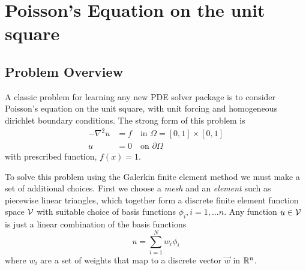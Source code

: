 %
%
%
%
%

\chapter{Poisson's Equation on the unit square}
\label{cha:poiss-equat-unit}

\section{Problem Overview}
\label{sec:problem-formulation}

A classic problem for learning any new PDE solver package is to
consider  Poisson's equation on the unit square,  with unit
forcing and homogeneous dirichlet boundary conditions.  The strong
form of this problem is
\begin{align}
-\nabla^2u &= f \quad\text{in } \Omega=[0,1]\times[0,1]\\
u &= 0 \quad\text{on } \partial\Omega
\end{align}
with  prescribed function, $f(x)=1$. 

To solve this problem using the Galerkin finite element method we must make a set of
additional choices. First we choose a \emph{mesh} and an \emph{element} such as
piecewise linear triangles, which together form a discrete finite
element function space $\mathcal{V}$ with suitable choice of basis
functions $\phi_{i}, i=1,\ldots n$. Any function $u\in\mathcal{V}$ is just a
linear combination of the basis functions
\begin{equation}
  \label{eq:6}
  u = \sum_{i=1}^{N} w_{i}\phi_{i}
\end{equation}
where $w_{i}$ are a set of weights that map to a discrete vector $\vec{w}$ in $\mathbb{R}^n{}$.


